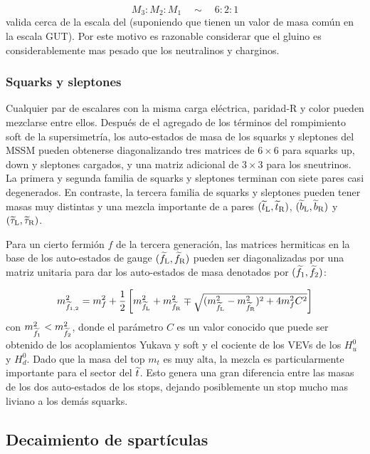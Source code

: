 \begin{equation}
  M_3 : M_2 : M_1 \quad \sim \quad 6 : 2 : 1
\end{equation}
%
valida cerca de la escala del \tev (suponiendo que tienen un valor de
masa común en la escala GUT). Por este motivo es razonable considerar
que el gluino es considerablemente mas pesado que los neutralinos y
charginos.


\subsubsection{Squarks y sleptones}

Cualquier par de escalares con la misma carga eléctrica, paridad-R y
color pueden mezclarse entre ellos. Después de el agregado de los
términos del rompimiento soft de la supersimetría, los auto-estados de
masa de los squarks y sleptones del MSSM pueden obtenerse
diagonalizando tres matrices de $6\times6$ para squarks up, down y
sleptones cargados, y una matriz adicional de $3\times 3$ para los
sneutrinos. La primera y segunda familia de squarks y sleptones
terminan con siete pares casi degenerados. En contraste, la tercera
familia de squarks y sleptones pueden tener masas muy distintas y una
mezcla importante de a pares $(\widetilde{t}_{\mathrm{L}}, \widetilde{t}_{\mathrm{R}})$, $(\widetilde{b}_{\mathrm{L}},
\widetilde{b}_{\mathrm{R}})$ y $(\widetilde{\tau}_{\mathrm{L}}, \widetilde{\tau}_{\mathrm{R}})$.

Para un cierto fermión $f$ de la tercera generación, las matrices
hermiticas en la base de los auto-estados de gauge $(\widetilde{f}_{\mathrm{L}},
\widetilde{f}_{\mathrm{R}})$ pueden ser diagonalizadas por una matriz unitaria para
dar los auto-estados de masa denotados por $(\widetilde{f}_{\mathrm{1}},
\widetilde{f}_{\mathrm{2}})$:

\begin{equation}
  m_{\widetilde{f}_{\mathrm{1,2}}}^2 = m^2_f + \frac{1}{2} \left[
    m_{\widetilde{f}_{\mathrm{L}}}^2 + m_{\widetilde{f}_{\mathrm{R}}}^2 \mp \sqrt{(m_{\widetilde{f}_{\mathrm{L}}}^2 -
      m_{\widetilde{f}_{\mathrm{R}}}^2)^2 + 4 m_f^2 C^2} \right]
\end{equation}
%
con $m_{\widetilde{f}_{\mathrm{1}}}^2 < m_{\widetilde{f}_{\mathrm{2}}}^2$, donde el parámetro $C$
es un valor conocido que puede ser obtenido de los acoplamientos
Yukava y soft y el cociente de los VEVs de los $H_u^0$ y $H_d^0$. Dado
que la masa del top $m_t$ es muy alta, la mezcla es particularmente
importante para el sector del $\widetilde{t}$. Esto genera una gran diferencia
entre las masas de los dos auto-estados de los stops, dejando
posiblemente un stop mucho mas liviano a los demás squarks.



\subsection{Decaimiento de spartículas}

